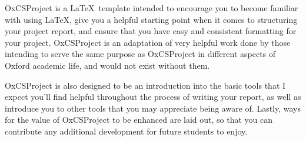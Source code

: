 OxCSProject is a \LaTeX\ template intended to encourage you to become familiar with using \LaTeX,
give you a helpful starting point when it comes to structuring your project report, and ensure
that you have easy and consistent formatting for your project. OxCSProject is an adaptation of
very helpful work done by those intending to serve the same purpose as OxCSProject in different
aspects of Oxford academic life, and would not exist without them.

OxCSProject is also designed to be an introduction into the basic tools that I expect you'll find
helpful throughout the process of writing your report, as well as introduce you to other tools
that you may appreciate being aware of. Lastly, ways for the value of OxCSProject to be enhanced
are laid out, so that you can contribute any additional development for future students to enjoy.
